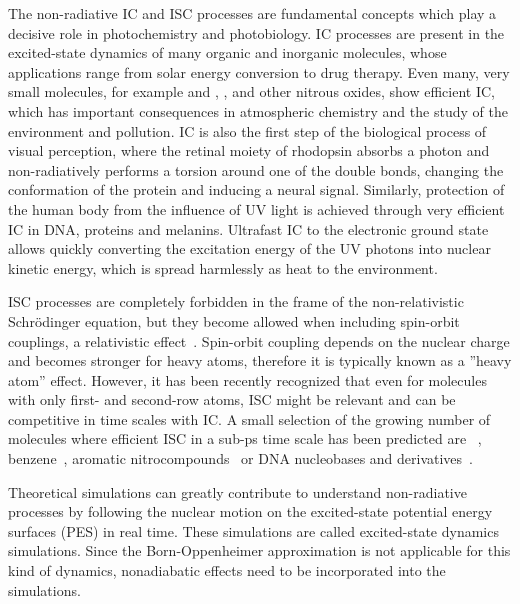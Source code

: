 \documentclass[a4paper,10pt,DIV=15,openany]{scrbook}
\begin{document}
The non-radiative IC and ISC processes are fundamental concepts which play a decisive role in photochemistry and photobiology. IC processes are present in the excited-state dynamics of many organic and inorganic molecules, whose applications range from solar energy conversion to drug therapy. Even many, very small molecules, for example  and , ,  and other nitrous oxides, show efficient IC, which has important consequences in atmospheric chemistry and the study of the environment and pollution. IC is also the first step of the biological process of visual perception, where the retinal moiety of rhodopsin absorbs a photon and non-radiatively performs a torsion around one of the double bonds, changing the conformation of the protein and inducing a neural signal. Similarly, protection of the human body from the influence of UV light is achieved through very efficient IC in DNA, proteins and melanins. Ultrafast IC to the electronic ground state allows quickly converting the excitation energy of the UV photons into nuclear kinetic energy, which is spread harmlessly as heat to the environment.

ISC processes are completely forbidden in the frame of the non-relativistic Schr\"odinger equation, but they become allowed when including spin-orbit couplings, a relativistic effect~\cite{Marian2012WCMS}. Spin-orbit coupling depends on the nuclear charge and becomes stronger for heavy atoms, therefore it is typically known as a ''heavy atom'' effect. However, it has been recently recognized that even for molecules with only first- and second-row atoms, ISC might be relevant and can be competitive in time scales with IC. A small selection of the growing number of molecules where efficient ISC in a sub-ps time scale has been predicted are ~\cite{Wilkinson2014JCP,Mai2014JCP_SO2,Leveque2014JCP_ISC}, benzene~\cite{Penfold2012JCP}, aromatic nitrocompounds~\cite{Vogt2013JPC} or DNA nucleobases and derivatives~\cite{Crespo-Hernandez2004CR, Richter2012JPCL, Martinez-Fernandez2012CC, Mai2013C, Reichardt2010CC}.

Theoretical simulations can greatly contribute to understand non-radiative processes by following the nuclear motion on the excited-state potential energy surfaces (PES) in real time. These simulations are called excited-state dynamics simulations. 
Since the Born-Oppenheimer approximation is not applicable for this kind of dynamics, nonadiabatic effects need to be incorporated into the simulations.
\end{document}
